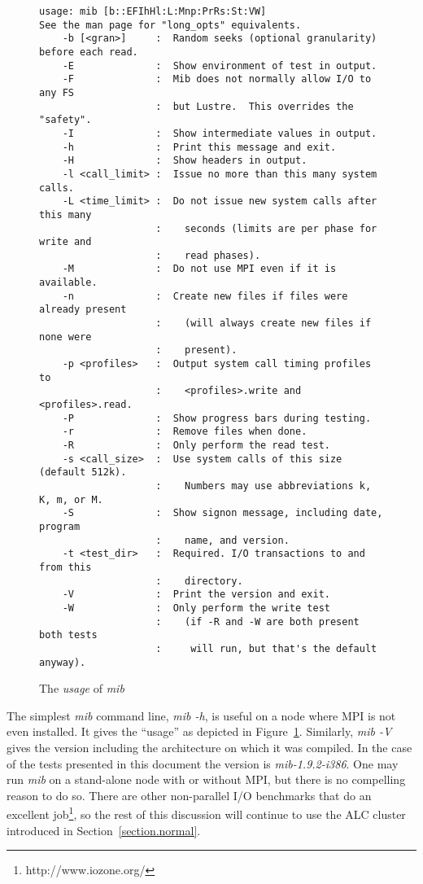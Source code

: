 \documentclass{article}
\begin{document}
\begin{figure}
{\small
  \begin{verbatim}
usage: mib [b::EFIhHl:L:Mnp:PrRs:St:VW]
See the man page for "long_opts" equivalents.
    -b [<gran>]     :  Random seeks (optional granularity) before each read.
    -E              :  Show environment of test in output.
    -F              :  Mib does not normally allow I/O to any FS
                    :  but Lustre.  This overrides the "safety".
    -I              :  Show intermediate values in output.
    -h              :  Print this message and exit.
    -H              :  Show headers in output.
    -l <call_limit> :  Issue no more than this many system calls.
    -L <time_limit> :  Do not issue new system calls after this many
                    :    seconds (limits are per phase for write and
                    :    read phases).
    -M              :  Do not use MPI even if it is available.
    -n              :  Create new files if files were already present
                    :    (will always create new files if none were
                    :    present).
    -p <profiles>   :  Output system call timing profiles to 
                    :    <profiles>.write and <profiles>.read.
    -P              :  Show progress bars during testing.
    -r              :  Remove files when done.
    -R              :  Only perform the read test.
    -s <call_size>  :  Use system calls of this size (default 512k).
                    :    Numbers may use abbreviations k, K, m, or M.
    -S              :  Show signon message, including date, program
                    :    name, and version.
    -t <test_dir>   :  Required. I/O transactions to and from this
                    :    directory.
    -V              :  Print the version and exit.
    -W              :  Only perform the write test
                    :    (if -R and -W are both present both tests 
                    :     will run, but that's the default anyway).
  \end{verbatim}
}
\caption{The {\em usage} of {\em mib}}
\label{figure.usage}
\end{figure}

The simplest {\em mib} command line, {\em mib -h}, is useful on a node
where MPI is not even installed.  It gives the ``usage'' as depicted
in Figure~\ref{figure.usage}.  Similarly, {\em mib -V} gives the
version including the architecture on which it was compiled.  In the
case of the tests presented in this document the version is {\em
mib-1.9.2-i386}.  One may run {\em mib} on a stand-alone node with or
without MPI, but there is no compelling reason to do so.  There are
other non-parallel I/O benchmarks that do an excellent
job\footnote{http://www.iozone.org/}, so the rest of this discussion
will continue to use the ALC cluster introduced in
Section~\ref{section.normal}.
\end{document}
